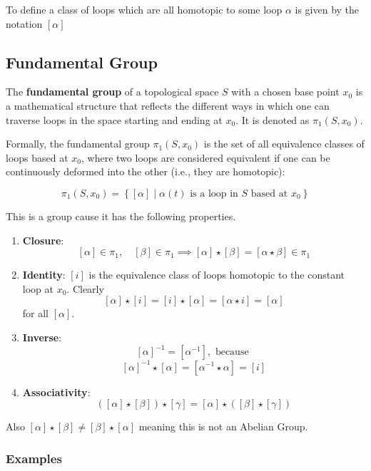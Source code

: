 \documentclass{article}
\begin{document}
To define a class of loops which are all homotopic to some loop \( \alpha \) is given by the notation \( [\alpha] \)


\subsection{Fundamental Group}

The \textbf{fundamental group} of a topological space \( S \) with a chosen base point \( x_0 \) is a mathematical structure that reflects the different ways in which one can traverse loops in the space starting and ending at \( x_0 \). It is denoted as \( \pi_1(S, x_0) \).


Formally, the fundamental group \( \pi_1(S, x_0) \) is the set of all equivalence classes of loops based at \( x_0 \), where two loops are considered equivalent if one can be continuously deformed into the other (i.e., they are homotopic):

\[
\pi_1(S, x_0) = \left\{ [\alpha] \mid \alpha(t) \text{ is a loop in } S \text{ based at } x_0 \right\}
\]

This is a group cause it has the following properties. 
\begin{enumerate}
    \item \textbf{Closure}: \[  [\alpha] \in \pi_1, \quad [\beta] \in \pi_1 \implies [\alpha] \star [\beta] = [\alpha \star \beta] \in \pi_1 \]

    \item \textbf{Identity}:  \([i]\) is the equivalence class of loops homotopic to the constant loop at \(x_0\). Clearly
        \[
        [\alpha] \star [i] = [i] \star [\alpha] = [\alpha \star i] = [\alpha]
        \]
        for all \([\alpha]\).

    \item \textbf{Inverse}:  \[
    [\alpha]^{-1} = [\alpha^{-1}], \text{ because }   \]
    \[  [\alpha]^{-1} \star [\alpha] = [\alpha^{-1} \star \alpha] = [i] \]

    \item \textbf{Associativity}: \[ ([\alpha] \star [\beta]) \star [\gamma] = [\alpha] \star ([\beta] \star [\gamma]) \]
\end{enumerate}

Also \(  [\alpha] \star [\beta] \neq [\beta] \star [\alpha] \) meaning this is not an Abelian Group. 

\subsubsection*{Examples}
\end{document}
